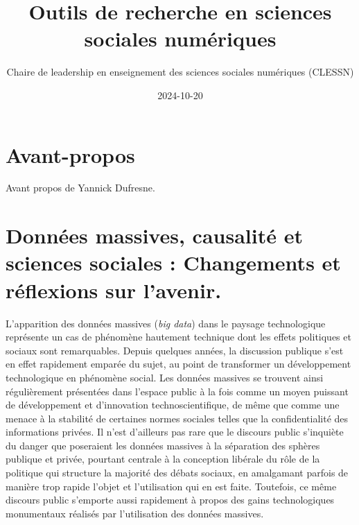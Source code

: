 \documentclass[
  letterpaper,
  DIV=11,
  numbers=noendperiod]{scrreprt}
\title{Outils de recherche en sciences sociales numériques}
\author{Chaire de leadership en enseignement des sciences sociales
numériques (CLESSN)}
\date{2024-10-20}
\renewcommand*\contentsname{Table of contents}
\newcommand\contentsname{Table of contents}
\begin{document}
\maketitle
\ifdefined\Shaded\renewenvironment{Shaded}{\begin{tcolorbox}[borderline west={3pt}{0pt}{shadecolor}, boxrule=0pt, sharp corners, interior hidden, frame hidden, enhanced, breakable]}{\end{tcolorbox}}\fi

\renewcommand*\contentsname{Table of contents}
{
\hypersetup{linkcolor=}
\setcounter{tocdepth}{2}
\tableofcontents
}

\hypertarget{avant-propos}{%
\chapter*{Avant-propos}\label{avant-propos}}


Avant propos de Yannick Dufresne.


\hypertarget{donnuxe9es-massives-causalituxe9-et-sciences-sociales-changements-et-ruxe9flexions-sur-lavenir.}{%
\chapter*{Données massives, causalité et sciences sociales : Changements
et réflexions sur
l'avenir.}\label{donnuxe9es-massives-causalituxe9-et-sciences-sociales-changements-et-ruxe9flexions-sur-lavenir.}}


L'apparition des données massives (\emph{big data}) dans le paysage
technologique représente un cas de phénomène hautement technique dont
les effets politiques et sociaux sont remarquables. Depuis quelques
années, la discussion publique s'est en effet rapidement emparée du
sujet, au point de transformer un développement technologique en
phénomène social. Les données massives se trouvent ainsi régulièrement
présentées dans l'espace public à la fois comme un moyen puissant de
développement et d'innovation technoscientifique, de même que comme une
menace à la stabilité de certaines normes sociales telles que la
confidentialité des informations privées. Il n'est d'ailleurs pas rare
que le discours public s'inquiète du danger que poseraient les données
massives à la séparation des sphères publique et privée, pourtant
centrale à la conception libérale du rôle de la politique qui structure
la majorité des débats sociaux, en amalgamant parfois de manière trop
rapide l'objet et l'utilisation qui en est faite. Toutefois, ce même
discours public s'emporte aussi rapidement à propos des gains
technologiques monumentaux réalisés par l'utilisation des données
massives.
\end{document}
